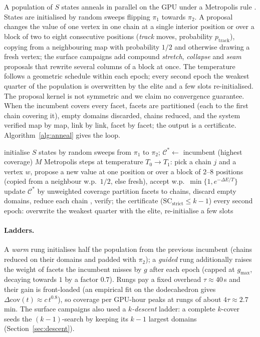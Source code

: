\documentclass[12pt]{article}
\newcommand{\SC}{\mathrm{SC}}
\newcommand{\SCst}{\SC_{\mathrm{strict}}}
\begin{document}
A population of $S$ states anneals in parallel on the GPU under a
Metropolis rule \cite{KGV83}.  States are initialised by random sweeps flipping $\pi_1$
towards $\pi_2$.  A proposal changes the value of one vertex in one chain at
a single interior position or over a block of two to eight consecutive
positions (\emph{track} moves, probability $p_{\mathrm{track}}$), copying
from a neighbouring map with probability $1/2$ and otherwise drawing a fresh
vertex; the surface campaigns add compound \emph{stretch}, \emph{collapse}
and \emph{seam} proposals that rewrite several columns of a block at once.
The temperature follows a geometric schedule within each epoch; every second
epoch the weakest quarter of the population is overwritten by the elite and a
few slots re-initialised.  The proposal kernel is not symmetric and we claim
no convergence guarantee.  When the incumbent covers every facet, facets are
partitioned (each to the first chain covering it), empty domains discarded,
chains reduced, and the system verified map by map, link by link, facet by
facet; the output is a certificate.  Algorithm~\ref{alg:anneal} gives the loop.

\begin{algorithm}[H]
\caption{\textsc{ChainAnneal}($K$, $k$, $c_{\max}$; $S$, $\beta$, $\gamma$,
$p_{\mathrm{track}}$).}
\label{alg:anneal}
\begin{algorithmic}[1]
\State initialise $S$ states by random sweeps from $\pi_1$ to $\pi_2$;
$\mathcal C^*\gets$ incumbent (highest coverage)
\State $M$ Metropolis steps at temperature $T_0\to T_1$: pick a chain $j$
and a vertex $w$, propose a new value at one position or over a block of
$2$--$8$ positions (copied from a neighbour w.p.\ $1/2$, else fresh), accept
w.p.\ $\min\{1,e^{-\Delta E/T}\}$
\EndFor
\State update $\mathcal C^*$ by unweighted coverage
\State partition facets to chains, discard empty domains, reduce each chain
\cite[Alg.~2]{OLGB21}, verify; \Return the certificate ($\SCst\le k-1$)
\EndIf
\State every second epoch: overwrite the weakest quarter with the elite,
re-initialise a few slots
\EndFor
\end{algorithmic}
\end{algorithm}

\paragraph{Ladders.}  A \emph{warm} rung initialises half the population
from the previous incumbent (chains reduced on their domains and padded with
$\pi_2$); a \emph{guided} rung additionally raises the weight of facets the
incumbent misses by $g$ after each epoch (capped at $g_{\max}$, decaying
towards $1$ by a factor $0.7$).  Rungs pay a fixed overhead
$\tau\approx40$\,s and their gain is front-loaded (an empirical fit on the
dodecahedron gives $\Delta\mathrm{cov}(t)\approx c\,t^{0.8}$), so coverage
per GPU-hour peaks at rungs of about $4\tau\approx2.7$\,min.  The surface
campaigns also used a \emph{$k$-descent} ladder: a complete $k$-cover seeds
the $(k{-}1)$-search by keeping its $k-1$ largest domains
(Section~\ref{sec:descent}).
\end{document}
